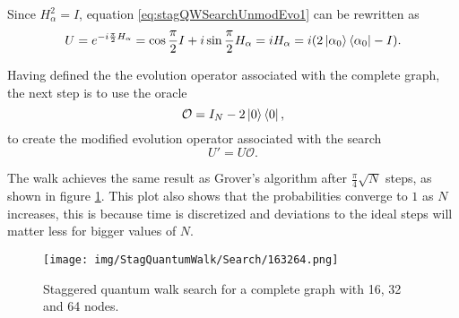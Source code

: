\documentclass[../../dissertation.tex]{subfiles}
\begin{document}
Since $H_\alpha^2 = I$, equation \ref{eq:stagQWSearchUnmodEvo1} can be rewritten as
\begin{equation}
	U = e^{-i\frac{\pi}{2} H_\alpha} = \cos{\frac{\pi}{2}I} + i\sin{\frac{\pi}{2}H_\alpha} = i H_\alpha = i(2\ket{\alpha_0}\bra{\alpha_0} - I).
\end{equation}\par
Having defined the the evolution operator associated with the complete graph, the next step is to use the oracle
\begin{equation}
	\mathcal{O} = I_N - 2\ket{0}\bra{0},
\end{equation}
to create the modified evolution operator associated with the search
\begin{equation}
	U' = U\mathcal{O}.
\end{equation}\par
The walk achieves the same result as Grover's algorithm after $\frac{\pi}{4}\sqrt{N}$ steps, as shown in figure \ref{fig:StagSearch}. This plot also shows that the probabilities converge to $1$ as $N$ increases, this is because time is discretized and deviations to the ideal steps will matter less for bigger values of $N$.
\begin{figure}[!h]
	\centering
	\texttt{[image: img/StagQuantumWalk/Search/163264.png]}
	\caption{Staggered quantum walk search for a complete graph with 16, 32 and 64 nodes.}
	\label{fig:StagSearch}
\end{figure}


\end{document}
